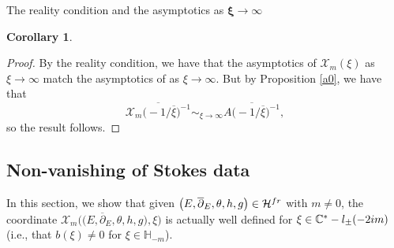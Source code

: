 \documentclass[11pt]{article}
\numberwithin{equation}{section}
\newtheorem{Corollary}[Theorem]{Corollary}
\numberwithin{equation}{section}
\newcommand{\MC}{\mathcal{X}_m}
\begin{document}
\begin{subsubsection}{The reality condition and the asymptotics as $\boldsymbol{\xi \to \infty}$}
\begin{Corollary}
\end{Corollary}

\begin{proof}
By the reality condition, we have that the asymptotics of $\MC(\xi)$ as $\xi \to \infty$ match the asymptotics of  as $\xi \to \infty$. But by Proposition \ref{a0}, we have that
\begin{equation*}
\overline{\mathcal{X}_m\bigl(-1/\overline{\xi}\bigr)^{-1}}\sim_{\xi \to \infty} \overline{A\bigl(-1/\overline{\xi}\bigr)^{-1}},
\end{equation*}
so the result follows.
\end{proof}

\end{subsubsection}

\subsection{Non-vanishing of Stokes data}\label{nonvanishing}

In this section, we show that given $\bigl(E,\overline{\partial}_E,\theta,h,g\bigr) \in \mathcal{H}^{{\rm fr}}$ with $m\neq 0$, the coordinate $\MC\bigl(\bigl(E,\overline{\partial}_E,\allowbreak\theta, h,g\bigr),\xi\bigr)$ is actually well defined for $\xi \in \mathbb{C}^* -l_{\pm}(-2{\rm i}m)$ (i.e., that $b(\xi)\neq 0$ for $\xi \in \mathbb{H}_{-m}$).
\end{document}
